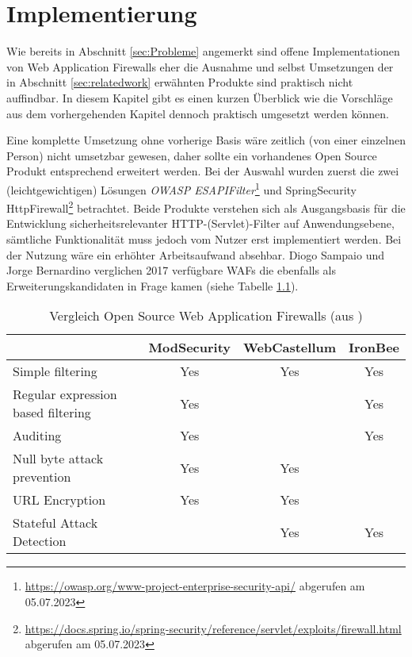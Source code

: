 \chapter{Implementierung}



Wie bereits in Abschnitt \ref{sec:Probleme} angemerkt sind offene Implementationen von Web Application Firewalls eher die Ausnahme und selbst Umsetzungen der in Abschnitt \ref{sec:relatedwork} erwähnten Produkte sind praktisch nicht auffindbar. In diesem Kapitel gibt es einen kurzen Überblick wie die Vorschläge aus dem vorhergehenden Kapitel dennoch praktisch umgesetzt werden können.

Eine komplette Umsetzung ohne vorherige Basis wäre zeitlich (von einer einzelnen Person) nicht umsetzbar gewesen, daher sollte ein vorhandenes Open Source Produkt entsprechend erweitert werden. Bei der Auswahl wurden zuerst die zwei (leichtgewichtigen) Lösungen \emph{OWASP ESAPIFilter}\footnote{\url{https://owasp.org/www-project-enterprise-security-api/} abgerufen am 05.07.2023} und {SpringSecurity HttpFirewall}\footnote{\url{https://docs.spring.io/spring-security/reference/servlet/exploits/firewall.html} abgerufen am 05.07.2023} betrachtet. Beide Produkte verstehen sich als Ausgangsbasis für die Entwicklung sicherheitsrelevanter HTTP-(Servlet)-Filter auf Anwendungsebene, sämtliche Funktionalität muss jedoch vom Nutzer erst implementiert werden. Bei der Nutzung wäre ein erhöhter Arbeitsaufwand absehbar. Diogo Sampaio und Jorge Bernardino verglichen 2017 verfügbare WAFs die ebenfalls als Erweiterungskandidaten in Frage kamen (siehe Tabelle \ref{tab:my_vergos}).


\begin{table}[h]
  \centering
  \begin{tabular}{lccc} 
    \toprule
    & \textbf{ModSecurity} & \textbf{WebCastellum} & \textbf{IronBee} \\ [0.5ex] 
    \midrule
    Simple filtering & Yes & Yes & Yes \\ 
    Regular expression based filtering & Yes &  & Yes \\
    Auditing & Yes &  & Yes \\
    Null byte attack prevention & Yes & Yes &  \\
    URL Encryption & Yes & Yes &  \\ [1ex] 
    Stateful Attack Detection & & Yes & Yes \\
    \bottomrule
  \end{tabular}
  \caption{Vergleich Open Source Web Application Firewalls (aus \cite{Sampaio2017}) }
  \label{tab:my_vergos}
\end{table}

